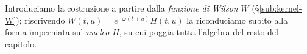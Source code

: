 \documentclass[11pt,a4paper]{article}
\theoremstyle{plain}
\theoremstyle{definition}
\newtheorem{definizione}[teorema]{Definizione}
\theoremstyle{remark}
\newcommand{\UFR}{\ensuremath{\mathrm{UFR}}}
\begin{document}
Introduciamo la costruzione a partire dalla \emph{funzione di Wilson} $W$
(§\ref{sub:kernel-W}); riscrivendo $W(t,u)=e^{-\omega(t+u)}H(t,u)$ la riconduciamo subito alla
forma imperniata sul \emph{nucleo} $H$, su cui poggia tutta l'algebra del resto del capitolo.

%
%
%
\end{document}
